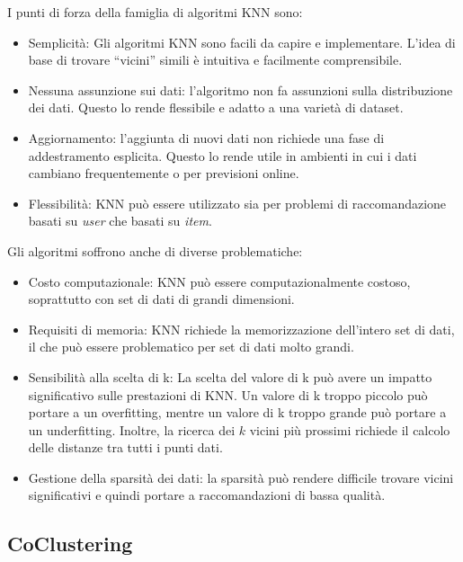 I punti di forza della famiglia di algoritmi KNN sono:
\begin{itemize}
    \item Semplicità: Gli algoritmi KNN sono facili da capire e implementare. L'idea di base di trovare ``vicini'' simili è intuitiva e facilmente comprensibile.
    \item Nessuna assunzione sui dati: l'algoritmo non fa assunzioni sulla distribuzione dei dati. Questo lo rende flessibile e adatto a una varietà di dataset.
    \item Aggiornamento: l'aggiunta di nuovi dati non richiede una fase di addestramento esplicita. Questo lo rende utile in ambienti in cui i dati cambiano frequentemente o per previsioni online.
    \item Flessibilità: KNN può essere utilizzato sia per problemi di raccomandazione basati su \textit{user} che basati su \textit{item}.
\end{itemize}

Gli algoritmi soffrono anche di diverse problematiche:
\begin{itemize}
    \item Costo computazionale: KNN può essere computazionalmente costoso, soprattutto con set di dati di grandi dimensioni.
    \item Requisiti di memoria: KNN richiede la memorizzazione dell'intero set di dati, il che può essere problematico per set di dati molto grandi.
    \item Sensibilità alla scelta di k: La scelta del valore di k può avere un impatto significativo sulle prestazioni di KNN. Un valore di k troppo piccolo può portare a un overfitting, mentre un valore di k troppo grande può portare a un underfitting. Inoltre, la ricerca dei $k$ vicini più prossimi richiede il calcolo delle distanze tra tutti i punti dati.
    \item Gestione della sparsità dei dati: la sparsità può rendere difficile trovare vicini significativi e quindi portare a raccomandazioni di bassa qualità.
\end{itemize}

\subsection{CoClustering}\label{coclustering}

